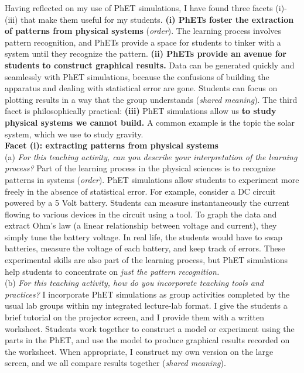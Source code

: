 \documentclass[../../../main.tex]{subfiles}
\begin{document}
Having reflected on my use of PhET simulations, I have found three facets (i)-(iii) that make them useful for my students. \textbf{(i) PhETs foster the extraction of patterns from physical systems} (\textit{order}).  The learning process involves pattern recognition, and PhETs provide a space for students to tinker with a system until they recognize the pattern. \textbf{(ii) PhETs provide an avenue for students to construct graphical results.} Data can be generated quickly and seamlessly with PhET simulations, because the confusions of building the apparatus and dealing with statistical error are gone.  Students can focus on plotting results in a way that the group understands (\textit{shared meaning}).  The third facet is philosophically practical: \textbf{(iii)} PhET simulations allow us \textbf{to study physical systems we cannot build.}  A common example is the topic the solar system, which we use to study gravity.
\\
\vspace{0.25cm}
\textbf{Facet (i): extracting patterns from physical systems}
\\
\vspace{0.25cm}
(a) \textit{For this teaching activity, can you describe your interpretation of the learning process?} Part of the learning process in the physical sciences is to recognize patterns in systems (\textit{order}).  PhET simulations allow students to experiment more freely in the absence of statistical error.  For example, consider a DC circuit powered by a 5 Volt battery.  Students can measure instantaneously the current flowing to various devices in the circuit using a tool.  To graph the data and extract Ohm's law (a linear relationship between voltage and current), they simply tune the battery voltage.  In real life, the students would have to swap batteries, measure the voltage of each battery, and keep track of errors.  These experimental skills are also part of the learning process, but PhET simulations help students to concentrate on \textit{just the pattern recognition.}
\\
\vspace{0.25cm}
(b) \textit{For this teaching activity, how do you incorporate teaching tools and practices?}  I incorporate PhET simulations as group activities completed by the usual lab groups within my integrated lecture-lab format.  I give the students a brief tutorial on the projector screen, and I provide them with a written worksheet.  Students work together to construct a model or experiment using the parts in the PhET, and use the model to produce graphical results recorded on the worksheet.  When appropriate, I construct my own version on the large screen, and we all compare results together (\textit{shared meaning}).
\end{document}
